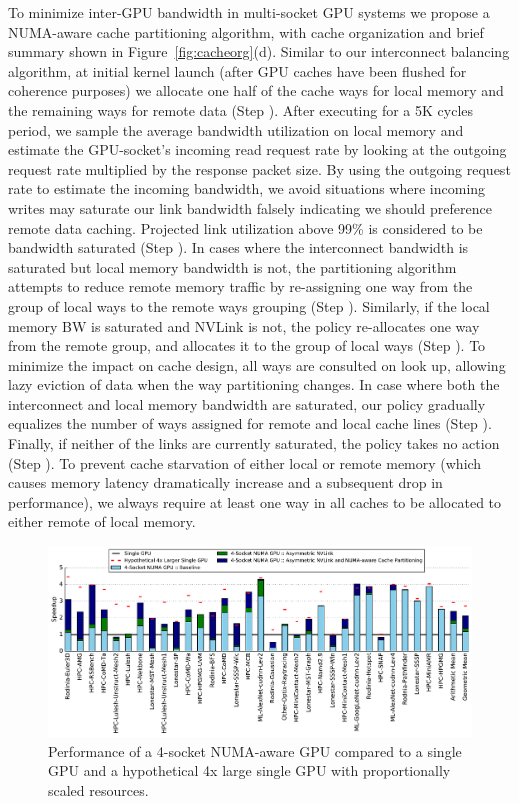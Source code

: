 To minimize inter-GPU bandwidth in multi-socket GPU systems we propose a
NUMA-aware cache partitioning algorithm, with cache organization and brief summary 
shown in Figure~\ref{fig:cacheorg}(d).  Similar to our interconnect balancing
algorithm, at initial kernel launch (after GPU caches have been flushed for
coherence purposes) we allocate one half of the cache ways for local memory and 
the remaining ways for remote data (Step ). After executing for a 5K cycles 
period, we sample the average bandwidth utilization on local memory and estimate
the GPU-socket's incoming read request rate by looking at the outgoing request rate
multiplied by the response packet size.  By using the outgoing request rate to estimate
the incoming bandwidth, we avoid situations where incoming writes may saturate
our link bandwidth falsely indicating we should preference remote data caching.
Projected link utilization above 99\% is considered to be bandwidth saturated 
(Step ). In cases where the interconnect bandwidth is saturated but
local memory bandwidth is not, the partitioning algorithm attempts to reduce remote 
memory traffic by re-assigning one way from the group of local ways to the
remote ways grouping (Step ).
Similarly, if the local memory BW is saturated and NVLink is not, the policy 
re-allocates one way from the remote group, and allocates it to the group of local ways (Step 
).  To minimize the impact on cache design, all ways are consulted on look
up, allowing lazy eviction of data when the way partitioning changes.
In case where both the interconnect and local memory bandwidth 
are saturated, our policy gradually equalizes the number of ways assigned for remote 
and local cache lines (Step ). Finally, if neither of the links are 
currently saturated, the policy takes no action (Step ).  To prevent
cache starvation of either local or remote memory (which causes memory latency
dramatically increase and a subsequent drop in performance), we always require at 
least one way in all caches to be allocated to either remote of local memory.

\begin{figure}[tp]
    \centering
    \includegraphics[width=1.0\textwidth]{figures/plot_final_speedup_WB_nvlink_first.pdf}
    \caption{Performance of a 4-socket NUMA-aware GPU compared to a single GPU and a hypothetical 4x large single GPU with proportionally scaled resources.}
    \label{fig:combined}
    \vspace{-.2in}
\end{figure}

